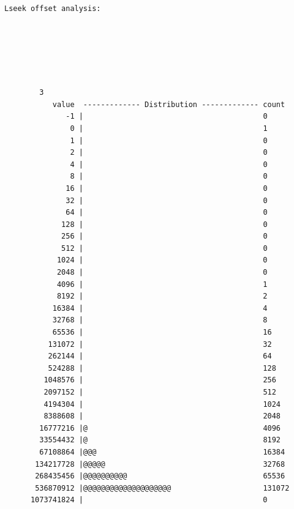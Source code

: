 \documentclass[a4paper]{article}
\begin{document}
{\begin{lstlisting}[style=output]
 Lseek offset analysis:






        3
           value  ------------- Distribution ------------- count    
              -1 |                                         0        
               0 |                                         1        
               1 |                                         0        
               2 |                                         0        
               4 |                                         0        
               8 |                                         0        
              16 |                                         0        
              32 |                                         0        
              64 |                                         0        
             128 |                                         0        
             256 |                                         0        
             512 |                                         0        
            1024 |                                         0        
            2048 |                                         0        
            4096 |                                         1        
            8192 |                                         2        
           16384 |                                         4        
           32768 |                                         8        
           65536 |                                         16       
          131072 |                                         32       
          262144 |                                         64       
          524288 |                                         128      
         1048576 |                                         256      
         2097152 |                                         512      
         4194304 |                                         1024     
         8388608 |                                         2048     
        16777216 |@                                        4096     
        33554432 |@                                        8192     
        67108864 |@@@                                      16384    
       134217728 |@@@@@                                    32768    
       268435456 |@@@@@@@@@@                               65536    
       536870912 |@@@@@@@@@@@@@@@@@@@@                     131072   
      1073741824 |                                         0        


\end{lstlisting}}
\end{document}
